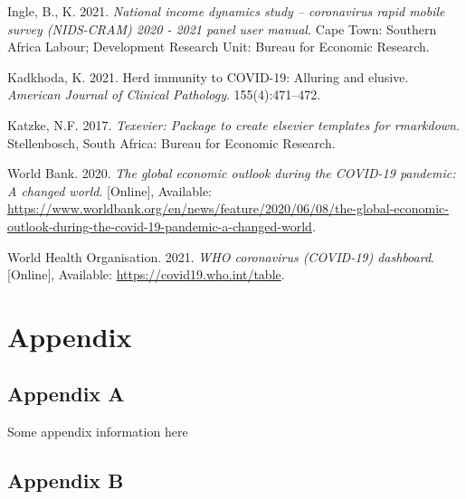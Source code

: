 \documentclass[11pt,preprint, authoryear]{elsarticle}
\numberwithin{equation}{section}
\numberwithin{figure}{section}
\numberwithin{table}{section}
\newlength{\cslhangindent}
\newenvironment{CSLReferences}%
  {\setlength{\parindent}{0pt}%
  \everypar{\setlength{\hangindent}{\cslhangindent}}\ignorespaces}%
  {\par}
\begin{document}
\begin{CSLReferences}{1}{0}
\leavevmode\hypertarget{ref-nids}{}%
Ingle, B., K. 2021. \emph{National income dynamics study -- coronavirus
rapid mobile survey (NIDS-CRAM) 2020 - 2021 panel user manual.} Cape
Town: Southern Africa Labour; Development Research Unit: Bureau for
Economic Research.

\leavevmode\hypertarget{ref-bad}{}%
Kadkhoda, K. 2021. Herd immunity to COVID-19: Alluring and elusive.
\emph{American Journal of Clinical Pathology}. 155(4):471--472.

\leavevmode\hypertarget{ref-Texevier}{}%
Katzke, N.F. 2017. \emph{{Texevier}: {P}ackage to create elsevier
templates for rmarkdown}. Stellenbosch, South Africa: Bureau for
Economic Research.

\leavevmode\hypertarget{ref-bank}{}%
World Bank. 2020. \emph{The global economic outlook during the COVID-19
pandemic: A changed world}. {[}Online{]}, Available:
\url{https://www.worldbank.org/en/news/feature/2020/06/08/the-global-economic-outlook-during-the-covid-19-pandemic-a-changed-world}.

\leavevmode\hypertarget{ref-who}{}%
World Health Organisation. 2021. \emph{WHO coronavirus (COVID-19)
dashboard}. {[}Online{]}, Available:
\url{https://covid19.who.int/table}.

\end{CSLReferences}

\hypertarget{appendix}{%
\section*{Appendix}\label{appendix}}

\hypertarget{appendix-a}{%
\subsection*{Appendix A}\label{appendix-a}}

Some appendix information here

\hypertarget{appendix-b}{%
\subsection*{Appendix B}\label{appendix-b}}


\end{document}
